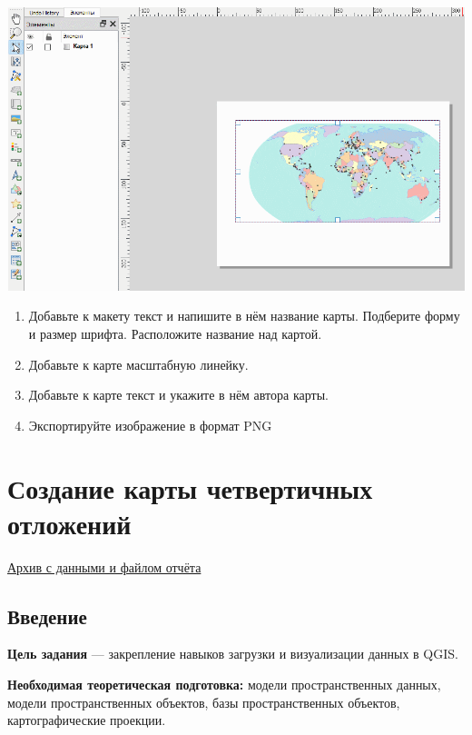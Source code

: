 \documentclass[
  12pt,
]{book}
\begin{document}
\includegraphics{images/Ex01_WorldMap/moveMap.gif}

\begin{enumerate}
\def\labelenumi{\arabic{enumi}.}
\setcounter{enumi}{9}
\item
  Добавьте к макету текст и напишите в нём название карты. Подберите форму и размер шрифта. Расположите название над картой.
\item
  Добавьте к карте масштабную линейку.
\item
  Добавьте к карте текст и укажите в нём автора карты.
\item
  Экспортируйте изображение в формат PNG
\end{enumerate}

\hypertarget{map-design-quaternary}{%
\chapter{Создание карты четвертичных отложений}\label{map-design-quaternary}}

\href{https://1drv.ms/u/s!AmtmZDq3JgxHgZUFCgDwGfEvocDIrw?e=LZbP6h}{Архив с данными и файлом отчёта}

\hypertarget{map-design-quaternary-intro}{%
\section{Введение}\label{map-design-quaternary-intro}}

\textbf{Цель задания} --- закрепление навыков загрузки и визуализации данных в QGIS.

\textbf{Необходимая теоретическая подготовка:} модели пространственных данных, модели пространственных объектов, базы пространственных объектов, картографические проекции.
\end{document}
